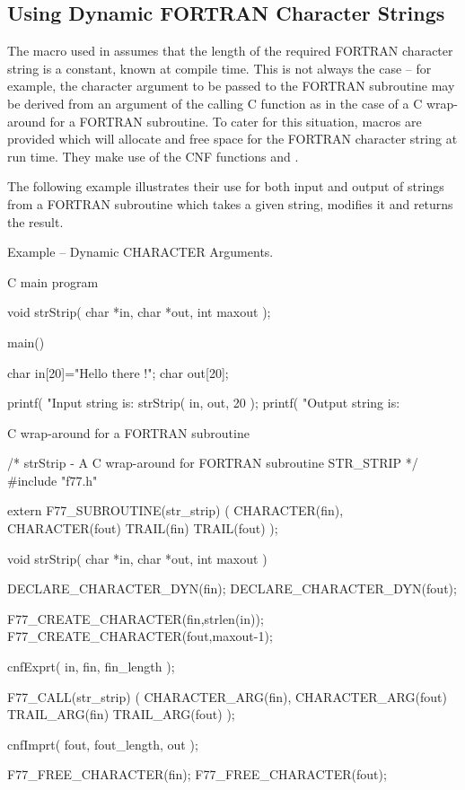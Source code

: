 \documentclass[twoside,11pt,nolof]{starlink}
\newcounter{examples}
\begin{document}
\subsection{\label{f77_chardyn}Using Dynamic FORTRAN Character Strings}
The
macro used in
 \latex{(\ref{cook_argsc2f})}
assumes that the length of the required FORTRAN character string is a constant,
known at compile time.
This is not always the case -- for example, the character argument to be
passed to the FORTRAN subroutine may be derived from an argument of the
calling C function as in the case of a C wrap-around for a FORTRAN subroutine.
To cater for this situation, macros are provided which will allocate and free
space for the FORTRAN character string at run time.
They make use of the CNF functions
and
.

The following example illustrates their use for both
input and output of strings from a FORTRAN subroutine which takes a given
string, modifies it and returns the result.

\label{f77_exchardyn}
\begin{center}
Example\latex{~\ref{f77_exchardyn}}
-- Dynamic CHARACTER Arguments.
\end{center}

C main program
\begin{small}
\begin{terminalv}
void strStrip( char *in, char *out, int maxout );

main(){
char in[20]="Hello  there  !";
char out[20];

printf( "Input string is: %
strStrip( in, out, 20 );
printf( "Output string is: %
}
\end{terminalv}
\end{small}
C wrap-around for a FORTRAN subroutine
\begin{small}
\begin{terminalv}
/* strStrip - A C wrap-around for FORTRAN subroutine STR_STRIP */
#include "f77.h"

extern F77_SUBROUTINE(str_strip)
  ( CHARACTER(fin), CHARACTER(fout) TRAIL(fin) TRAIL(fout) );

void strStrip( char *in, char *out, int maxout ){
  DECLARE_CHARACTER_DYN(fin);
  DECLARE_CHARACTER_DYN(fout);

  F77_CREATE_CHARACTER(fin,strlen(in));
  F77_CREATE_CHARACTER(fout,maxout-1);

  cnfExprt( in, fin, fin_length );

  F77_CALL(str_strip)
     ( CHARACTER_ARG(fin), CHARACTER_ARG(fout)
       TRAIL_ARG(fin) TRAIL_ARG(fout) );

  cnfImprt( fout, fout_length, out );

  F77_FREE_CHARACTER(fin);
  F77_FREE_CHARACTER(fout);
}
\end{terminalv}
\end{small}
\end{document}
